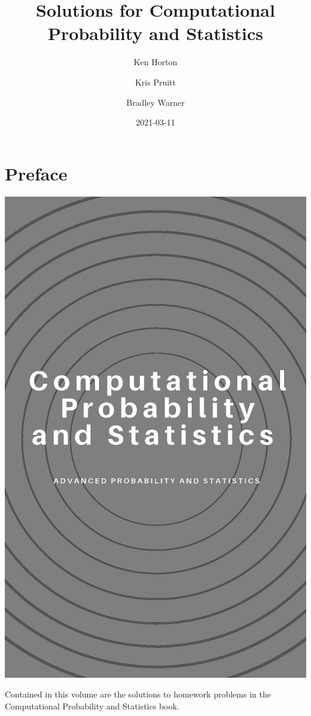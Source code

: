 \documentclass[
]{book}
\title{Solutions for Computational Probability and Statistics}
\author{Ken Horton \and Kris Pruitt \and Bradley Warner}
\date{2021-03-11}
\begin{document}
\maketitle

{
\setcounter{tocdepth}{1}
\tableofcontents
}
\hypertarget{preface}{%
\chapter*{Preface}\label{preface}}

\includegraphics[width=19.58in]{./figures/CoverSol2}

Contained in this volume are the solutions to homework problems in the Computational Probability and Statistics book.
\end{document}
